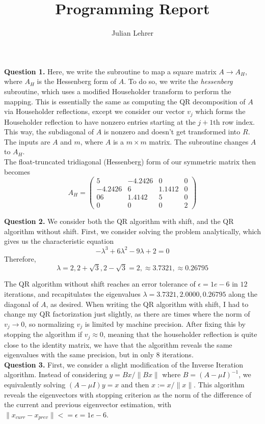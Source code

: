 \documentclass{article}
\title{Programming Report}
\date{}
\author{Julian Lehrer}
\newcommand{\ra}{\longrightarrow}
\begin{document}
\maketitle
\textbf{Question 1.} Here, we write the subroutine to map a square matrix $A \ra A_H$, where $A_H$ is the Hessenberg form of $A$. To do so, we write the \textit{hessenberg} subroutine, which uses a modified Householder transform to perform the mapping. This is essentially the same as computing the QR decomposition of $A$ via Householder reflections, except we consider our vector $v_j$ which forms the Householder reflection to have nonzero entries starting at the $j+1$th row index. This way, the subdiagonal of $A$ is nonzero and doesn't get transformed into $R$. The inputs are $A$ and $m$, where $A$ is a $m \times m$ matrix. The subroutine changes $A$ to $A_H$.\\

The float-truncated tridiagonal (Hessenberg) form of our symmetric matrix then becomes 
\begin{equation*}
    A_H=\begin{pmatrix}
        5&-4.2426& 0 & 0 \\
        -4.2426&6&1.1412& 0 \\
        06&1.4142&5&0\\
        0&0&0&2    
    \end{pmatrix}
\end{equation*}

\textbf{Question 2.} We consider both the QR algorithm with shift, and the QR algorithm without shift. First, we consider solving the problem analytically, which gives us the characteristic equation 
\begin{equation*}
    -\lambda^3 +6\lambda^2 -9\lambda + 2=0
\end{equation*}
Therefore, 
\begin{equation*}
    \lambda = 2, 2+\sqrt{3}, 2-\sqrt{3} = 2, \approx 3.7321, \approx 0.26795
\end{equation*}

The QR algorithm without shift reaches an error tolerance of $\epsilon = 1e-6$ in $12$ iterations, and recapitulates the eigenvalues $\lambda = 3.7321, 2.0000, 0.26795$ along the diagonal of $A$, as desired. When writing the QR algorithm with shift, I had to change my QR factorization just slightly, as there are times where the norm of $v_j \ra 0$, so normalizing $v_j$ is limited by machine precision. After fixing this by stopping the algorithm if $v_j \approx 0$, meaning that the householder reflection is quite close to the identity matrix, we have that the algorithm reveals the same eigenvalues with the same precision, but in only $8$ iterations. \\

\textbf{Question 3.} First, we consider a slight modification of the Inverse Iteration algorithm. Instead of considering $y = Bx/\|Bx\|$ where $B=(A-\mu I)^{-1}$, we equivalently solving $(A-\mu I)y = x$ and then $x := x/\|x\|$. This algorithm reveals the eigenvectors with stopping criterion as the norm of the difference of the current and previous eigenvector estimation, with $\|x_{curr}-x_{prev}\| <= \epsilon = 1e-6$. 
\end{document}
